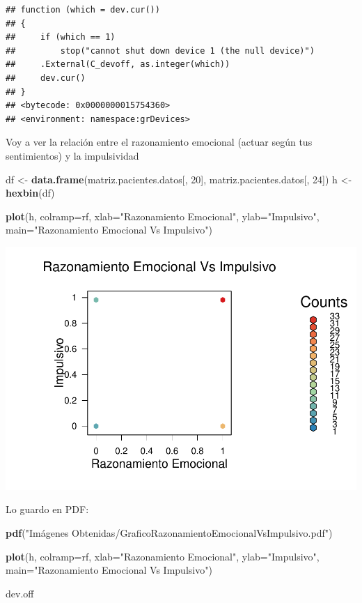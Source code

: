 \documentclass[]{article}
\newenvironment{Shaded}{\begin{snugshade}}{\end{snugshade}}
\newcommand{\KeywordTok}[1]{\textcolor[rgb]{0.13,0.29,0.53}{\textbf{#1}}}
\newcommand{\DataTypeTok}[1]{\textcolor[rgb]{0.13,0.29,0.53}{#1}}
\newcommand{\DecValTok}[1]{\textcolor[rgb]{0.00,0.00,0.81}{#1}}
\newcommand{\StringTok}[1]{\textcolor[rgb]{0.31,0.60,0.02}{#1}}
\newcommand{\NormalTok}[1]{#1}
\begin{document}
\begin{verbatim}
## function (which = dev.cur()) 
## {
##     if (which == 1) 
##         stop("cannot shut down device 1 (the null device)")
##     .External(C_devoff, as.integer(which))
##     dev.cur()
## }
## <bytecode: 0x0000000015754360>
## <environment: namespace:grDevices>
\end{verbatim}

Voy a ver la relación entre el razonamiento emocional (actuar según tus
sentimientos) y la impulsividad

\begin{Shaded}
\begin{Highlighting}[]
\NormalTok{df <-}\StringTok{ }\KeywordTok{data.frame}\NormalTok{(matriz.pacientes.datos[, }\DecValTok{20}\NormalTok{], matriz.pacientes.datos[, }\DecValTok{24}\NormalTok{])}
\NormalTok{h <-}\StringTok{ }\KeywordTok{hexbin}\NormalTok{(df)}

\KeywordTok{plot}\NormalTok{(h, }\DataTypeTok{colramp=}\NormalTok{rf, }\DataTypeTok{xlab=}\StringTok{"Razonamiento Emocional"}\NormalTok{, }\DataTypeTok{ylab=}\StringTok{"Impulsivo"}\NormalTok{, }\DataTypeTok{main=}\StringTok{"Razonamiento Emocional Vs Impulsivo"}\NormalTok{)}
\end{Highlighting}
\end{Shaded}

\includegraphics{codigo_files/figure-latex/grafico_razEm_Impulsivo-1.pdf}

Lo guardo en PDF:

\begin{Shaded}
\begin{Highlighting}[]
\KeywordTok{pdf}\NormalTok{(}\StringTok{"Imágenes Obtenidas/GraficoRazonamientoEmocionalVsImpulsivo.pdf"}\NormalTok{)}

\KeywordTok{plot}\NormalTok{(h, }\DataTypeTok{colramp=}\NormalTok{rf, }\DataTypeTok{xlab=}\StringTok{"Razonamiento Emocional"}\NormalTok{, }\DataTypeTok{ylab=}\StringTok{"Impulsivo"}\NormalTok{, }\DataTypeTok{main=}\StringTok{"Razonamiento Emocional Vs Impulsivo"}\NormalTok{)}

\NormalTok{dev.off}
\end{Highlighting}
\end{Shaded}
\end{document}
